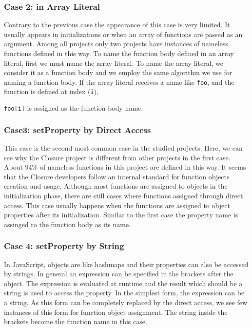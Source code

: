 \documentclass[10pt, preprint]{sigplanconf}
\begin{document}
\subsubsection{Case 2: in Array Literal}
Contrary to the previous case the appearance of this case is very limited. It usually appears in initializations or when an array of functions are passed as an argument. Among all projects only two projects have instances of nameless functions defined in this way. To name the function body defined in an array literal, first we must name the array literal. To name the array literal, we consider it as a function body and we employ the same algorithm we use for naming a function body. If the array literal receives a name like {\small\texttt{foo}}, and the function is defined at index ({\small\texttt{i}}), {{\small\texttt{foo[i]}} is assigned as the function body name. 


\subsubsection{Case3: setProperty by Direct Access }
This case is the second most common case in the studied projects. Here, we can see why the Closure project is different from other projects in the first case. About 94\% of nameless functions in this project are defined in this way. It seems that the Closure developers follow an internal standard for function objects creation and usage. Although most functions are assigned to objects in the initialization phase, there are still cases where functions assigned through direct access. 
This case usually happens when the functions are assigned to object properties after its initialization. Similar to the first case the property name is assinged to the function body as its name. 
 

\subsubsection{Case 4: setProperty by String}
In JavaScript, objects are like hashmaps and their properties can also be accessed by strings. In general an expression can be specified in the brackets after the object. The expression is evaluated at runtime and the result which should be a string is used to access the property. In the simplest form, the expression can be a string. As this form can be completely replaced by the direct access, we see few instances of this form for function object assignment. The string inside the brackets become the function name in this case.

}
\end{document}
